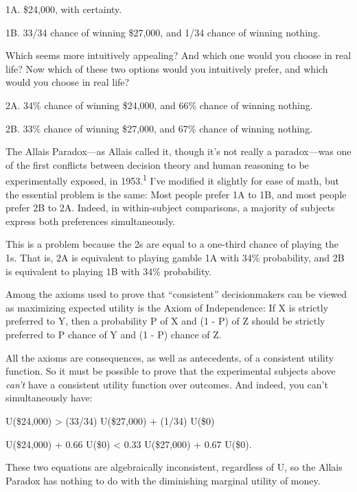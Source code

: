 {
 1A. \$24,000, with certainty.}

{
 1B. 33/34 chance of winning \$27,000, and 1/34 chance of winning
nothing.}

{
 Which seems more intuitively appealing? And which one would you
choose in real life? Now which of these two options would you
intuitively prefer, and which would you choose in real life?}

{
 2A. 34\% chance of winning \$24,000, and 66\% chance of winning
nothing.}

{
 2B. 33\% chance of winning \$27,000, and 67\% chance of winning
nothing.}

{
 The Allais Paradox---as Allais called it, though
it's not really a paradox---was one of the first
conflicts between decision theory and human reasoning to be
experimentally exposed, in 1953.\textsuperscript{1}
I've modified it slightly for ease of math, but the
essential problem is the same: Most people prefer 1A to 1B, and most
people prefer 2B to 2A. Indeed, in within-subject comparisons, a
majority of subjects express both preferences simultaneously.}

{
 This is a problem because the 2s are equal to a one-third chance
of playing the 1s. That is, 2A is equivalent to playing gamble 1A with
34\% probability, and 2B is equivalent to playing 1B with 34\%
probability.}

{
 Among the axioms used to prove that
``consistent'' decisionmakers can be
viewed as maximizing expected utility is the Axiom of Independence: If
X is strictly preferred to Y, then a probability P of X and (1 - P) of
Z should be strictly preferred to P chance of Y and (1 - P) chance of
Z.}

{
 All the axioms are consequences, as well as antecedents, of a
consistent utility function. So it must be possible to prove that the
experimental subjects above \textit{can't} have a
consistent utility function over outcomes. And indeed, you
can't simultaneously have:}

{\centering
 U(\$24,000) {\textgreater} (33/34) {\texttimes} U(\$27,000) +
(1/34) {\texttimes} U(\$0)
\par}


\bigskip

{ {\texttimes} U(\$24,000) + 0.66 {\texttimes} U(\$0)
{\textless} 0.33 {\texttimes} U(\$27,000) + 0.67 {\texttimes} U(\$0).
\par}


\bigskip

{
 These two equations are algebraically inconsistent, regardless of
U, so the Allais Paradox has nothing to do with the diminishing
marginal utility of money. }

